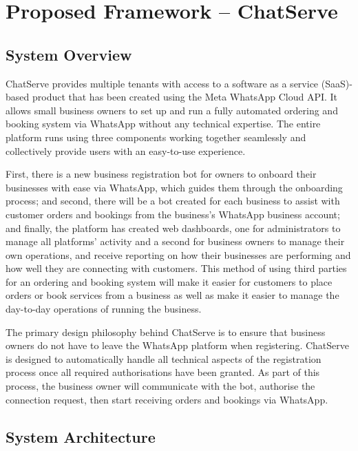 \chapter{Proposed Framework -- ChatServe}

\section{System Overview}

ChatServe provides multiple tenants with access to a software as a service (SaaS)-based product that has been created using the Meta WhatsApp Cloud API. It allows small business owners to set up and run a fully automated ordering and booking system via WhatsApp without any technical expertise. The entire platform runs using three components working together seamlessly and collectively provide users with an easy-to-use experience. 

First, there is a new business registration bot for owners to onboard their businesses with ease via WhatsApp, which guides them through the onboarding process; and second, there will be a bot created for each business to assist with customer orders and bookings from the business's WhatsApp business account; and finally, the platform has created web dashboards, one for administrators to manage all platforms' activity and a second for business owners to manage their own operations, and receive reporting on how their businesses are performing and how well they are connecting with customers. This method of using third parties for an ordering and booking system will make it easier for customers to place orders or book services from a business as well as make it easier to manage the day-to-day operations of running the business.

The primary design philosophy behind ChatServe is to ensure that business owners do not have to leave the WhatsApp platform when registering. ChatServe is designed to automatically handle all technical aspects of the registration process once all required authorisations have been granted. As part of this process, the business owner will communicate with the bot, authorise the connection request, then start receiving orders and bookings via WhatsApp.


\section{System Architecture}

